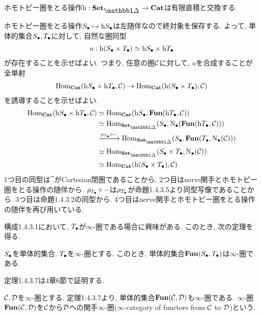 \documentclass[uplatex, a4paper, 14Q, dvipdfmx]{jsreport}
\begin{document}
\begin{Proof}
  
\end{Proof}

\begin{cor}
  ホモトピー圏をとる操作$\h: \sset \to \cat$は有限直積と交換する. 
\end{cor}

\begin{Proof}
  ホモトピー圏をとる操作$\S \mt \h\S$は左随伴なので終対象を保存する. 
  よって, 単体的集合$\S,\T$に対して, 自然な圏同型
  \begin{align*}
    u: \h(\S \ti \T) \simeq \h\S \ti \h\T
  \end{align*}
  が存在することを示せばよい. 
  つまり, 任意の圏$\calC$に対して, $u$を合成することが全単射
  \begin{align*}
    \Hom_{\cat}(\h\S \ti \h\T,\calC) \to \Hom_{\cat}(\h(\S \ti \T),\calC)
  \end{align*}
  を誘導することを示せばよい.
  \begin{align*}
    \Hom_{\cat}(\h\S \ti \h\T,\calC) 
    &\simeq \Hom_{\cat}(\h\S,\fun(\h\T,\calC)) \\
    &\simeq \Hom_{\sset}(\S,\N(\fun(\h\T,\calC))) \\
    &\xr{\rho_{\T} \ci -} \Hom_{\sset}(\S,\fun(\T,\N(\calC))) \\
    &\simeq \Hom_{\sset}(\S \ti \T,\N(\calC)) \\
    &\simeq \Hom_{\cat}(\h(\S \ti \T),\calC)
  \end{align*}
  1つ目の同型は$\cat$がCartesian閉圏であることから.
  2つ目はnerve関手とホモトピー圏をとる操作の随伴から.
  $\rho_{\T} \ci -$は$\rho_{\T}$が命題1.4.3.5より同型写像であることから.
  3つ目は命題1.4.3.2の同型から. 
  4つ目はnerve関手とホモトピー圏をとる操作の随伴を再び用いている.
\end{Proof}

構成1.4.3.1において, $\T$が$\infty$-圏である場合に興味がある. 
このとき, 次の定理を得る.

\begin{theorem}
  $\S$を単体的集合, $\T$を$\infty$-圏とする. 
  このとき, 単体的集合$\fun(\S,\T)$は$\infty$-圏である.
\end{theorem}

定理1.4.3.7は4章6節で証明する. 

\begin{definition}
  $\calC, \calD$を$\infty$-圏とする. 
  定理1.4.3.7より, 単体的集合$\fun(\calC,\calD)$も$\infty$-圏である. 
  $\infty$-圏$\fun(\calC,\calD)$を$\calC$から$\calD$への関手$\infty$-圏($\infty$-category of functors from $\calC$ to $\calD$)という.
\end{definition}
\end{document}
